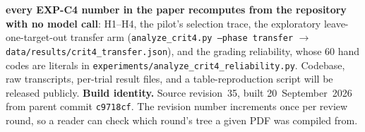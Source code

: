 \documentclass{article} %
\begin{document}
\textbf{every EXP-C4 number in the paper recomputes from the repository with no model
call}: H1--H4, the pilot's selection trace, the exploratory leave-one-target-out
transfer arm (\texttt{analyze\_crit4.py --phase transfer} $\to$
\texttt{data/results/crit4\_transfer.json}), and the grading reliability, whose 60
hand codes are literals in \texttt{experiments/analyze\_crit4\_reliability.py}.
Codebase, raw
transcripts, per-trial result files, and a table-reproduction script will be
released publicly.
\textbf{Build identity.} Source revision~35, built 20~September~2026 from parent
commit \texttt{c9718cf}. The revision number increments once per review round, so
a reader can check which round's tree a given PDF was compiled from.




\newpage
\appendix
\renewcommand\thesection{\AlphAlph{\value{section}}}

\end{document}

